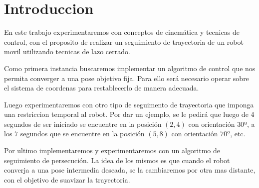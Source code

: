 \section{Introduccion}
En este trabajo experimentaremos con conceptos de cinemática y tecnicas de control, con el proposito de realizar un seguimiento de trayectoria de un robot movil utilizando tecnicas de lazo cerrado.

Como primera instancia buscaremos implementar un algoritmo de control que nos permita converger a una pose objetivo fija. Para ello será necesario operar sobre el sistema de coordenas para restablecerlo de manera adecuada.

Luego experimentaremos con otro tipo de seguimento de trayectoria que imponga una restriccion temporal al robot. Por dar un ejemplo, se le pedirá que luego de 4 segundos de ser iniciado se encuentre en la posición $(2,4)$ con orientación $30º$, a los $7$ segundos que se encuentre en la posición $(5,8)$ con orientación $70º$, etc.

Por ultimo implementaremos y experimentaremos con un algoritmo de seguimiento de persecución. La idea de los mismos es que cuando el robot converja a una pose intermedia deseada, se la cambiaremos por otra mas distante, con el objetivo de suavizar la trayectoria.